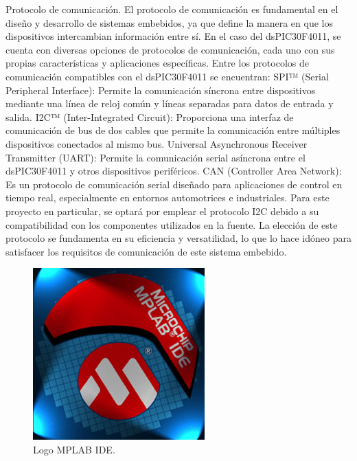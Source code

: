 Protocolo de comunicación.
El protocolo de comunicación es fundamental en el diseño y desarrollo de sistemas embebidos, ya que define la manera en que los dispositivos intercambian información entre sí. En el caso del dsPIC30F4011, se cuenta con diversas opciones de protocolos de comunicación, cada uno con sus propias características y aplicaciones específicas.
Entre los protocolos de comunicación compatibles con el dsPIC30F4011 se encuentran:
SPI™ (Serial Peripheral Interface): Permite la comunicación síncrona entre dispositivos mediante una línea de reloj común y líneas separadas para datos de entrada y salida.
I2C™ (Inter-Integrated Circuit): Proporciona una interfaz de comunicación de bus de dos cables que permite la comunicación entre múltiples dispositivos conectados al mismo bus.
Universal Asynchronous Receiver Transmitter (UART): Permite la comunicación serial asíncrona entre el dsPIC30F4011 y otros dispositivos periféricos.
CAN (Controller Area Network): Es un protocolo de comunicación serial diseñado para aplicaciones de control en tiempo real, especialmente en entornos automotrices e industriales.
Para este proyecto en particular, se optará por emplear el protocolo I2C debido a su compatibilidad con los componentes utilizados en la fuente. La elección de este protocolo se fundamenta en su eficiencia y versatilidad, lo que lo hace idóneo para satisfacer los requisitos de comunicación de este sistema embebido.

\begin{figure}
    \centering
    \includegraphics[scale=0.5]{./imagenes/mplab.jpg}
    \caption{Logo MPLAB IDE.}
    \label{F:LogoMPLAB}
\end{figure}

